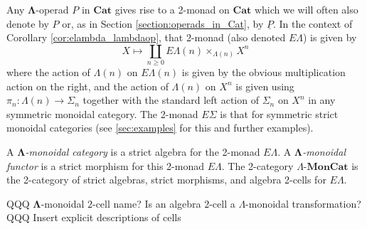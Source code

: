 \documentclass{amsbook} %
\newcommand{\mb}{\mathbf}
\newcommand{\ML}{\mathbf{\Lambda}}
\newcommand{\EL}{E\Lambda}
\newcommand{\lmc}{\Lambda\mbox{-}\mb{MonCat}}
\numberwithin{section}{chapter}
\begin{document}
Any $\mb{\Lambda}$-operad $P$ in $\mb{Cat}$ gives rise to a 2-monad on $\mb{Cat}$ which we will often also denote by $P$ or, as in Section \ref{section:operads_in_Cat}, by $\underline{P}$.  In the context of Corollary \ref{cor:elambda_lambdaop}, that 2-monad (also denoted $E\Lambda$) is given by
  \[
    X \mapsto \coprod_{n \geq 0} E\Lambda(n) \times_{\Lambda(n)} X^{n}
  \]
where the action of $\Lambda(n)$ on $E\Lambda(n)$ is given by the obvious multiplication action on the right, and the action of $\Lambda(n)$ on $X^{n}$ is given using $\pi_{n} \colon \Lambda(n) \rightarrow \Sigma_{n}$ together with the standard left action of $\Sigma_{n}$ on $X^{n}$ in any symmetric monoidal category. The 2-monad $E\Sigma$ is that for symmetric strict monoidal categories (see \cref{sec:examples} for this and further examples).

\begin{Defi}\label{lmc}
A \emph{$\ML$-monoidal category} is a strict algebra for the 2-monad $\EL$. A \emph{$\ML$-monoidal functor} is a strict morphism for this 2-monad $\EL$. The 2-category $\lmc$ is the 2-category of strict algebras, strict morphisms, and algebra 2-cells for $\EL$.
\end{Defi}
QQQ $\ML$-monoidal $2$-cell name? Is an algebra $2$-cell a $\Lambda$-monoidal transformation?
QQQ Insert explicit descriptions of cells
\end{document}
